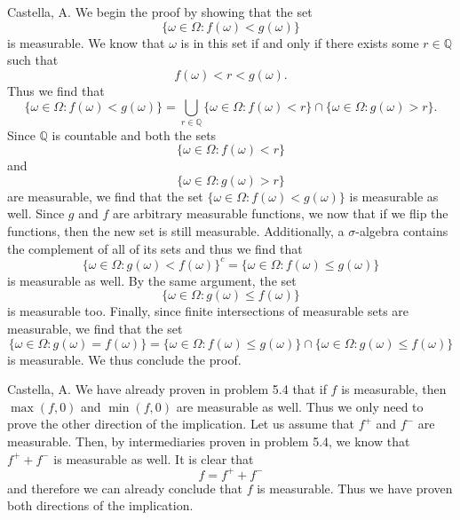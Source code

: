 \begin{solution}[5.8]{Castella, A.}
    We begin the proof by showing that the set
    $$
        \{\omega \in \Omega : f(\omega) < g(\omega)\}
    $$
    is measurable. We know that $\omega$ is in this set if and only if there exists some $r \in \mathbb{Q}$ such that
    $$
        f(\omega) < r < g(\omega).
    $$
    Thus we find that
    $$
        \{\omega \in \Omega : f(\omega) < g(\omega)\} = \bigcup_{r \in \mathbb{Q}}\{\omega\in\Omega : f(\omega) < r\} \cap \{\omega\in\Omega : g(\omega) > r\}.
    $$
    Since $\mathbb{Q}$ is countable and both the sets
    $$
        \{\omega \in \Omega : f(\omega) < r\}
    $$
    and
    $$
        \{\omega \in \Omega : g(\omega) > r\}
    $$
    are measurable, we find that the set $\{\omega \in \Omega : f(\omega) < g(\omega)\}$ is measurable as well. Since $g$ and $f$ are arbitrary measurable functions, we now that if we flip the functions, then the new set is still measurable. Additionally, a $\sigma$-algebra contains the complement of all of its sets and thus we find that
    $$
        \{\omega \in \Omega : g(\omega) < f(\omega)\}^c = \{\omega \in \Omega : f(\omega) \leq g(\omega)\}
    $$
    is measurable as well. By the same argument, the set
    $$
        \{\omega \in \Omega : g(\omega) \leq f(\omega)\}
    $$
    is measurable too. Finally, since finite intersections of measurable sets are measurable, we find that the set
    $$
        \{\omega \in \Omega : g(\omega) = f(\omega)\} = \{\omega \in \Omega : f(\omega) \leq g(\omega)\} \cap \{\omega \in \Omega : g(\omega) \leq f(\omega)\}
    $$
    is measurable. We thus conclude the proof.
\end{solution}

\begin{solution}[5.14]{Castella, A.}
    We have already proven in problem 5.4 that if $f$ is measurable, then $\max(f,0)$ and $\min(f,0)$ are measurable as well. Thus we only need to prove the other direction of the implication. Let us assume that $f^+$ and $f^-$ are measurable. Then, by intermediaries proven in problem 5.4, we know that $f^+ + f^-$ is measurable as well. It is clear that
    $$
        f = f^+ + f^-
    $$
    and therefore we can already conclude that $f$ is measurable. Thus we have proven both directions of the implication. 
\end{solution}